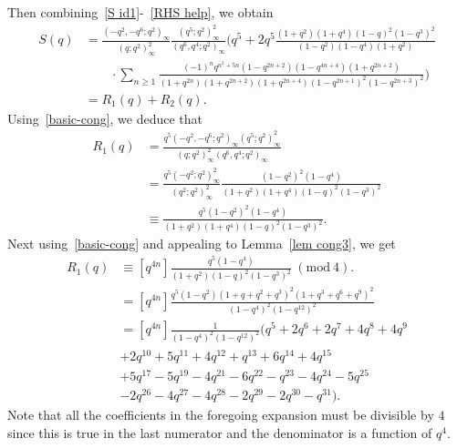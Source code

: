 \documentclass[reqno]{amsart}
\theoremstyle{definition}
\theoremstyle{plain}
\theoremstyle{remark}
\numberwithin{equation}{section}
\newcommand{\Mod}[1]{\ (\mathrm{mod}\ #1)}
\newcommand{\fr}{\frac}
\begin{document}
Then combining~\eqref{S id1}-~\eqref{RHS help}, we obtain
\begin{align*}
S(q) &= \fr{(-q^2,-q^6;q^2)_\infty}{(q;q^2)_\infty^2}\fr{(q^5;q^2)_\infty^2}{(q^6,q^4;q^2)_\infty}
\Big( q^5+2 q^5 \fr{(1+q^2)(1+q^4)(1-q)^2(1-q^3)^2}{(1-q^2)(1-q^4)(1+q^2)} \\
&\qquad \cdot \sum_{n\geq 1}\fr{(-1)^n q^{n^2+5n}(1-q^{2n+2})(1-q^{4n+4})(1+q^{2n+2})}{(1+q^{2n})(1+q^{2n+2})(1+q^{2n+4})(1-q^{2n+1})^2 (1-q^{2n+3})^2} \Big) \\
&= R_1(q) + R_2(q).
\end{align*}
Using~\eqref{basic-cong}, we deduce that
\begin{align*}
R_1(q) &= \fr{q^5 (-q^2,-q^6;q^2)_\infty (q^5;q^2)_\infty^2}{(q;q^2)_\infty^2(q^6,q^4;q^2)_\infty} \\
&=\fr{q^5 (-q^2;q^2)_\infty^2}{(q^2;q^2)_\infty^2} \fr{(1-q^2)^2 (1-q^4)}{(1+q^2)(1+q^4)(1-q)^2 (1-q^3)^2} \\
&\equiv \fr{q^5 (1-q^2)^2 (1-q^4)}{(1+q^2)(1+q^4)(1-q)^2 (1-q^3)^2}.
\end{align*}
Next using~\eqref{basic-cong} and appealing to Lemma~\ref{lem cong3},
we get
\begin{align*}
[q^{4n}]R_1(q)
& \equiv [q^{4n}] \fr{q^5 (1-q^4)}{(1+q^2)(1-q)^2 (1-q^3)^2} \Mod{4}. \\
&=[q^{4n}] \fr{q^5(1-q^2)(1+q+q^2+q^3)^2 (1+q^3+q^6+q^9)^2}{(1-q^4)^2 (1-q^{12})^2} \\
&=[q^{4n}] \fr{1}{(1-q^4)^2 (1-q^{12})^2}
\Big(
     q^5 + 2q^6 + 2q^7 + 4q^8 + 4q^9 \\
& + 2q^{10} + 5q^{11}
     + 4q^{12} + q^{13} + 6q^{14} + 4q^{15} \\
 &+ 5q^{17} - 5q^{19} - 4q^{21}
    - 6q^{22} - q^{23} - 4q^{24} - 5q^{25} \\
&   - 2q^{26} - 4q^{27} - 4q^{28} - 2q^{29} - 2q^{30} - q^{31}
\Big).
\end{align*}
Note that all the coefficients in the foregoing expansion must be divisible by $4$ since this is true
in the last numerator and the denominator is a function of $q^4$.
\end{document}
